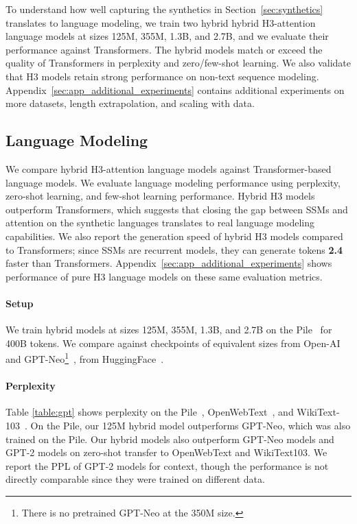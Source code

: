 \documentclass{article}
\newcommand{\hthree}{\textsc{H3}\xspace}
\newcommand{\num}[1]{{\color{red}\bf{#1}\normalfont}}
\newcommand{\num}[1]{#1}
\begin{document}
To understand how well capturing the synthetics in Section~\ref{sec:synthetics} translates to language modeling, we train two hybrid hybrid \hthree-attention language models at sizes 125M, 355M, 1.3B, and 2.7B, and we evaluate their performance against Transformers.
The hybrid models match or exceed the quality of Transformers in perplexity and zero/few-shot learning.
We also validate that \hthree models retain strong performance on non-text sequence modeling.
Appendix~\ref{sec:app_additional_experiments} contains additional experiments on more datasets, length extrapolation, and scaling with data.

\subsection{Language Modeling}
\label{subsec:language_modeling}

We compare hybrid \hthree-attention language models against Transformer-based language models.
We evaluate language modeling performance using perplexity, zero-shot learning, and few-shot learning performance.
Hybrid \hthree models outperform Transformers, which suggests that closing the gap between SSMs and attention on the synthetic languages translates to real language modeling capabilities.
We also report the generation speed of hybrid \hthree models compared to Transformers; since SSMs are recurrent models, they can generate tokens \num{2.4} faster than Transformers.
Appendix~\ref{sec:app_additional_experiments} shows performance of pure \hthree language models on these same evaluation metrics.

\paragraph{Setup}
We train hybrid models at sizes 125M, 355M, 1.3B, and 2.7B on the Pile~\citep{gao2020pile} for 400B tokens.
We compare against checkpoints of equivalent sizes from
Open-AI~\citep{radford2019language} and GPT-Neo\footnote{There
  is no pretrained GPT-Neo at the 350M size.}~\citep{gpt-neo},
from HuggingFace~\citep{wolf-etal-2020-transformers}.


\paragraph{Perplexity}
Table \ref{table:gpt} shows perplexity on the Pile~\citep{gao2020pile}, OpenWebText~\citep{Gokaslan2019OpenWeb}, and WikiText-103~\citep{merity2016pointer}. 
On the Pile, our 125M hybrid model outperforms GPT-Neo, which was also trained on the Pile.
Our hybrid models also outperform GPT-Neo models and GPT-2 models on zero-shot transfer to OpenWebText and WikiText103.
We report the PPL of GPT-2 models for context, though the performance is not directly comparable since they were trained on different data.
\end{document}
